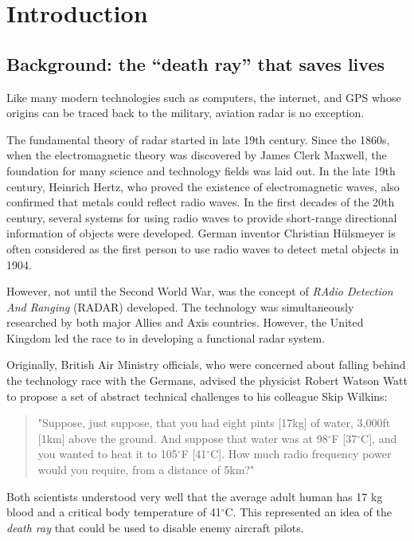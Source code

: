 \chapter{Introduction} \label{chap:intro}

\section{Background: the ``death ray'' that saves lives}

Like many modern technologies such as computers, the internet, and GPS whose origins can be traced back to the military, aviation radar is no exception. 

The fundamental theory of radar started in late 19th century. Since the 1860s, when the electromagnetic theory was discovered by James Clerk Maxwell, the foundation for many science and technology fields was laid out. In the late 19th century, Heinrich Hertz, who proved the existence of electromagnetic waves, also confirmed that metals could reflect radio waves. In the first decades of the 20th century, several systems for using radio waves to provide short-range directional information of objects were developed. German inventor 
Christian H\"ulsmeyer is often considered as the first person to use radio waves to detect metal objects in 1904.

However, not until the Second World War, was the concept of \emph{RAdio Detection And Ranging} (RADAR) developed. The technology was simultaneously researched by both major Allies and Axis countries. However, the United Kingdom led the race to in developing a functional radar system. 

Originally, British Air Ministry officials, who were concerned about falling behind the technology race with the Germans, advised the physicist Robert Watson Watt to propose a set of abstract technical challenges to his colleague Skip Wilkins:

\begin{quotation}
\noindent"Suppose, just suppose, that you had eight pints [17kg] of water, 3,000ft [1km] above the ground. And suppose that water was at 98$^\circ$F [37$^\circ$C], and you wanted to heat it to 105$^\circ$F [41$^\circ$C]. How much radio frequency power would you require, from a distance of 5km?"
\end{quotation}

Both scientists understood very well that the average adult human has 17 kg blood and a critical body temperature of 41$^\circ$C. This represented an idea of the \emph{death ray} that could be used to disable enemy aircraft pilots.

